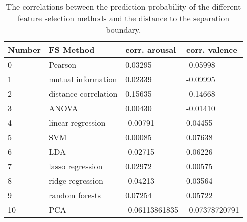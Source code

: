 \begin{table}[H]
\centering
\caption{The correlations between the prediction probability of the different feature selection methods and the distance to the separation boundary\label{corrsCompLblGen}.}
\begin{tabular}{llll}
\textbf{Number} & \textbf{FS Method}        & \textbf{corr. arousal} & \textbf{corr. valence} \\ \hline
0               & Pearson              & 0.03295          & -0.05998         \\
1               & mutual information   & 0.02339          & -0.09995         \\
2               & distance correlation & 0.15635          & -0.14668         \\
3               & ANOVA                & 0.00430          & -0.01410         \\
4               & linear regression    & -0.00791         & 0.04455          \\
5               & SVM                  & 0.00085          & 0.07638          \\
6               & LDA                  & -0.02715         & 0.06226          \\
7               & lasso regression     & 0.02972          & 0.00575          \\
8               & ridge regression     & -0.04213         & 0.03564          \\
9               & random forests       & 0.07254          & 0.05722          \\
10              & PCA                  & -0.06113861835   & -0.07378720791  
\end{tabular}
\end{table}



